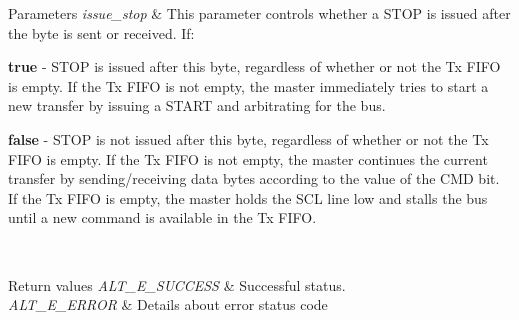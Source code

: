 \begin{DoxyParams}{Parameters}
\hline
{\em issue\+\_\+stop} & This parameter controls whether a S\+T\+OP is issued after the byte is sent or received. If\+:
\begin{DoxyItemize}
\item {\bfseries{true}} -\/ S\+T\+OP is issued after this byte, regardless of whether or not the Tx F\+I\+FO is empty. If the Tx F\+I\+FO is not empty, the master immediately tries to start a new transfer by issuing a S\+T\+A\+RT and arbitrating for the bus.
\item {\bfseries{false}} -\/ S\+T\+OP is not issued after this byte, regardless of whether or not the Tx F\+I\+FO is empty. If the Tx F\+I\+FO is not empty, the master continues the current transfer by sending/receiving data bytes according to the value of the C\+MD bit. If the Tx F\+I\+FO is empty, the master holds the S\+CL line low and stalls the bus until a new command is available in the Tx F\+I\+FO.
\end{DoxyItemize}\\
\hline
\end{DoxyParams}

\begin{DoxyRetVals}{Return values}
{\em A\+L\+T\+\_\+\+E\+\_\+\+S\+U\+C\+C\+E\+SS} & Successful status. \\
\hline
{\em A\+L\+T\+\_\+\+E\+\_\+\+E\+R\+R\+OR} & Details about error status code \\
\hline
\end{DoxyRetVals}
